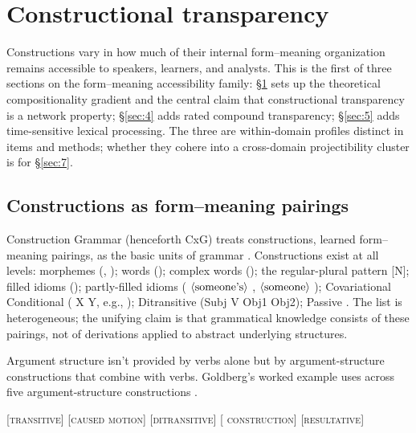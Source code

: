 \section{Constructional transparency}\label{sec:3}

Constructions vary in how much of their internal form--meaning organization remains accessible to speakers, learners, and analysts. This is the first of three sections on the form--meaning accessibility family: §\ref{sec:3} sets up the theoretical compositionality gradient and the central claim that constructional transparency is a network property; §\ref{sec:4} adds rated compound transparency; §\ref{sec:5} adds time-sensitive lexical processing. The three are within-domain profiles distinct in items and methods; whether they cohere into a cross-domain projectibility cluster is for §\ref{sec:7}.

\subsection{Constructions as form--meaning pairings}

Construction Grammar (henceforth CxG) treats constructions, learned form--meaning pairings, as the basic units of grammar \autocite{goldberg-2006-constructions-at-work}. Constructions exist at all levels: morphemes (, ); words (); complex words (); the regular-plural pattern [N]; filled idioms (); partly-filled idioms ( \(\langle\textup{someone's}\rangle\) ,  \(\langle\textup{someone}\rangle\) ); Covariational Conditional ( X Y, e.g., ); Ditransitive (Subj V Obj1 Obj2); Passive \autocite[5, Table 1.1]{goldberg-2006-constructions-at-work}. The list is heterogeneous; the unifying claim is that grammatical knowledge consists of these pairings, not of derivations applied to abstract underlying structures.

Argument structure isn't provided by verbs alone but by argument-structure constructions that combine with verbs. Goldberg's worked example uses  across five argument-structure constructions \autocite[6--7]{goldberg-2006-constructions-at-work}.

\ea\label{ex:slice-constructions}
\ea {}\hfill[\textsc{transitive}]
\ex {}\hfill[\textsc{caused motion}]
\ex {}\hfill[\textsc{ditransitive}]
\ex {}\hfill[ \textsc{construction}]
\ex {}\hfill[\textsc{resultative}]
\z
\z

